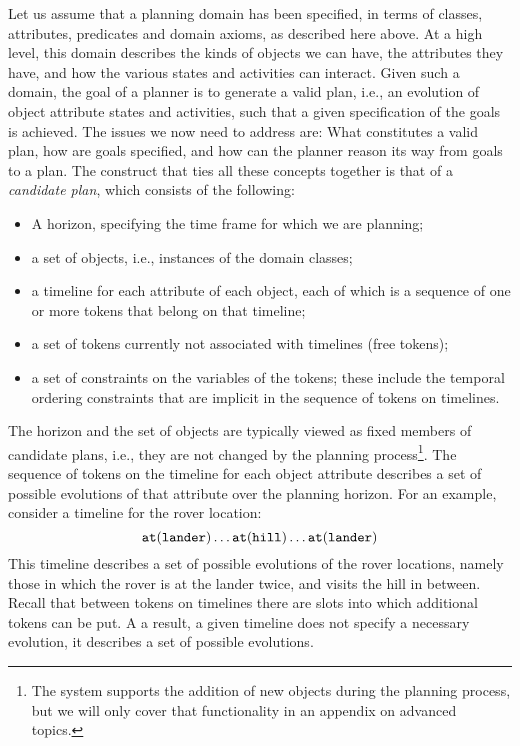 Let us assume that a planning domain has been specified, in terms of
classes, attributes, predicates and domain axioms, as described here
above.  At a high level, this domain describes the kinds of objects we
can have, the attributes they have, and how the various states and
activities can interact.  Given such a domain, the goal of a planner
is to generate a valid plan, i.e., an evolution of object attribute
states and activities, such that a given specification of the goals is
achieved.  The issues we now need to address are: What constitutes a
valid plan, how are goals specified, and how can the planner reason
its way from goals to a plan.  The construct that ties all these
concepts together is that of a {\em candidate plan}, which consists of
the following:
  \begin{itemize}
  \item A horizon, specifying the time frame for which we are planning;
  \item a set of objects, i.e., instances of the domain classes;
  \item a timeline for each attribute of each object, each of which is
a sequence of one or more tokens that belong on that timeline;
  \item a set of tokens currently not associated with timelines (free
  tokens);
  \item a set of constraints on the variables of the tokens; these
include the temporal ordering constraints that are implicit in the
sequence of tokens on timelines.
  \end{itemize}

The horizon and the set of objects are typically viewed as fixed
members of candidate plans, i.e., they are not changed by the planning
process\footnote{The system supports the addition of new objects
during the planning process, but we will only cover that functionality
in an appendix on advanced topics.}.  The sequence of tokens on the
timeline for each object attribute describes a set of possible
evolutions of that attribute over the planning horizon.  For an
example, consider a timeline for the rover location:
  $${\tt at(lander)} \ldots {\tt at(hill)} \ldots {\tt at(lander)}$$
  This timeline describes a set of possible evolutions of the rover
locations, namely those in which the rover is at the lander twice, and
visits the hill in between.  Recall that between tokens on timelines
there are slots into which additional tokens can be put.  A a result,
a given timeline does not specify a necessary evolution, it describes
a set of possible evolutions.

